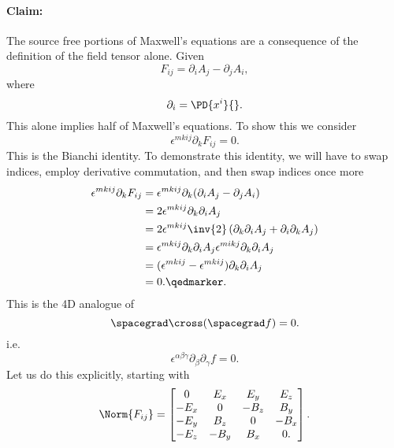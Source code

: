 \paragraph{Claim: } The source free portions of Maxwell's equations are a consequence of the definition of the field tensor alone.
Given
\begin{equation}\label{eqn:relativisticElectrodynamicsL11:670}
F_{i j} = \partial_i A_j - \partial_j A_i,
\end{equation}
where
\begin{equation}\label{eqn:relativisticElectrodynamicsL11:690}
\partial_i = \PD{x^i}{}.
\end{equation}
%
This alone implies half of Maxwell's equations.  To show this we consider
%
\begin{equation}\label{eqn:relativisticElectrodynamicsL11:710}
\epsilon^{m k i j} \partial_k F_{i j} = 0.
\end{equation}
%
This is the Bianchi identity.  To demonstrate this identity, we will have to swap indices, employ derivative commutation, and then swap indices once more
%
\begin{equation}\label{eqn:relativisticElectrodynamicsL11b:1380}
\begin{aligned}
\epsilon^{m k i j} \partial_k F_{i j}
&= \epsilon^{m k i j} \partial_k (\partial_i A_j - \partial_j A_i) \\
&= 2 \epsilon^{m k i j} \partial_k \partial_i A_j \\
&= 2 \epsilon^{m k i j} \inv{2} \left( \partial_k \partial_i A_j + \partial_i \partial_k A_j \right) \\
&=
\epsilon^{m k i j} \partial_k \partial_i A_j
\epsilon^{m i k j} \partial_k \partial_i A_j  \\
&=
(\epsilon^{m k i j} - \epsilon^{m k i j}) \partial_k \partial_i A_j \\
&= 0. \qedmarker.
\end{aligned}
\end{equation}
%
This is the 4D analogue of
%
\begin{equation}\label{eqn:relativisticElectrodynamicsL11:790}
\spacegrad \cross (\spacegrad f) = 0.
\end{equation}
%
i.e.
%
\begin{equation}\label{eqn:relativisticElectrodynamicsL11:810}
\epsilon^{\alpha\beta\gamma} \partial_\beta \partial_\gamma f = 0.
\end{equation}
%
Let us do this explicitly, starting with
%
\begin{equation}\label{eqn:relativisticElectrodynamicsL11:370b}
\Norm{ F_{i j} } =
\begin{bmatrix}
0 & E_x & E_y & E_z \\
-E_x & 0 & -B_z & B_y \\
-E_y & B_z & 0 & -B_x \\
-E_z & -B_y & B_x & 0.
\end{bmatrix}.
\end{equation}
